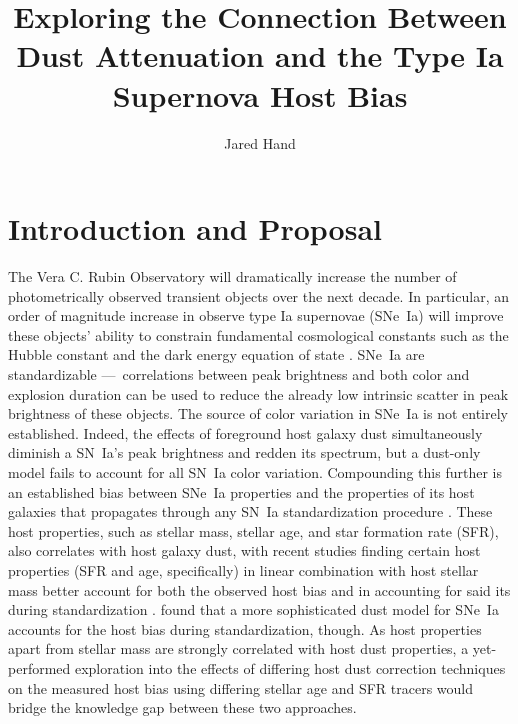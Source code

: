 \documentclass[modern]{aastex63}
\begin{document}
\title{Exploring the Connection Between Dust Attenuation and the Type Ia Supernova Host Bias}

\author{Jared Hand}

\section{Introduction and Proposal}
The Vera C. Rubin Observatory will dramatically increase the number of photometrically observed transient objects over the next decade. 
In particular, an order of magnitude increase in observe type Ia supernovae (SNe~Ia) will improve these objects' ability to constrain fundamental cosmological constants such as the Hubble constant and the dark energy equation of state \citep{Perlmutter1999}.  SNe~Ia are standardizable ---~correlations between peak brightness and both color and explosion duration can be used to reduce the already low intrinsic scatter in peak brightness of these objects.  
The source of color variation in SNe~Ia is not entirely established.  
Indeed, the effects of foreground host galaxy dust simultaneously diminish a SN~Ia's peak brightness and redden its spectrum, but a dust-only model fails to account for all SN~Ia color variation.  
Compounding this further is an established bias between SNe~Ia properties and the properties of its host galaxies that propagates through any SN~Ia standardization procedure \citep{Rigault2018,Sullivan2010}. 
These host properties, such as stellar mass, stellar age, and star formation rate (SFR), also correlates with host galaxy dust, with recent studies finding certain host properties (SFR and age, specifically) in linear combination with host stellar mass better account for both the observed host bias and in accounting for said its during standardization \citep{Rigault2018,Rose2021}. 
\cite{Brout2021} found that a more sophisticated dust model for SNe~Ia accounts for the host bias during standardization, though.
As host properties apart from stellar mass are strongly correlated with host dust properties, a yet-performed exploration into the effects of differing host dust correction techniques on the measured host bias using differing stellar age and SFR tracers would bridge the knowledge gap between these two approaches. 
\end{document}

